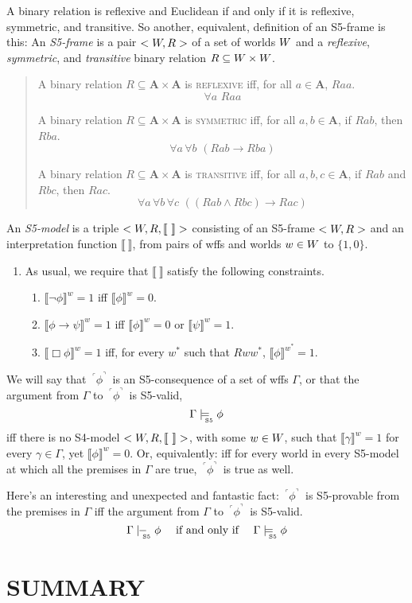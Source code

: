 \documentclass[landscape, two column, full page,reqno]{article}
\let\mathcal\relax
\newcommand{\mathcal}{\OMScal}%
\newcommand{\qd}{\begin{quote}\begin{description}  [align=left,style=nextline,leftmargin=*,labelsep=0pt,font=\normalfont]}
\newcommand{\zd}{\end{description}\end{quote}}
\newcommand{\qe}{\begin{enumerate}[align=left,style=nextline,leftmargin=17pt,labelsep=5pt,font=\normalfont]}
\newcommand{\ze}{\end{enumerate}}
\newcommand{\p}{\item}
\newcommand{\e}{\emph}
\newcommand{\mbf}{\mathbf}
\newcommand{\s}{\textsc}
\newcommand{\fns}[1]{{\footnotesize #1}}
\newcommand{\qq}[1]{ ~\!^\ulcorner #1  ^\urcorner~\!}
\newcommand{\V}[1]{\llbracket #1 \rrbracket}
\newcommand{\sfivemodels}{\models_{\!\!\!\raisebox{-3pt}{\text{\tiny S5}}}}
\newcommand{\sfiveproves}{\mid\hspace{-3.9pt}-_{\!\!\!\raisebox{-3pt}{\text{\tiny S5}}}\hspace{3pt}}
\newcommand{\B}{\Box}
\newcommand{\hs}{\hspace{2pt}}
\begin{document}
\p A binary relation is reflexive and Euclidean if and only if it is reflexive, symmetric, and transitive. So another, equivalent, definition of an S5-frame is this: An \e{S5-frame} is a pair $< \mathcal{W}, R >$ of a set of worlds $\mathcal{W}$ and a \e{reflexive}, \e{symmetric}, and \e{transitive} binary relation $R \subseteq \mathcal{W} \times \mathcal{W}$. 
	\qd
	\p[\s{reflexivity}] A binary relation $R \subseteq \mbf{A} \times \mbf{A}$ is \s{reflexive} iff, for all $a \in \mbf{A}$, $Raa$.
		\[
		\forall a \hs\hs Raa
		\]
	\p[\s{symmetry}] A binary relation $R \subseteq \mbf{A} \times \mbf{A}$ is \s{symmetric} iff, for all $a, b \in \mbf{A}$, if $Rab$, then $Rba$.
		\[
		\forall a \hs \forall b \hs\hs (Rab \to Rba)
		\]
	\p[\s{transitivity}] A binary relation $R \subseteq \mbf{A} \times \mbf{A}$ is \s{transitive} iff, for all $a, b, c \in \mbf{A}$, if $Rab$ and $Rbc$, then $Rac$.
		\[
		\forall a \hs \forall b \hs \forall c \hs\hs ((R ab \wedge Rbc) \to Rac)
		\]
	\zd
\p An \e{S5-model} is a triple $<\mathcal{W}, R, \V{~}>$ consisting of an S5-frame $<\mathcal{W}, R>$ and an interpretation function $\V{~}$, from pairs of wffs and worlds $w \in \mathcal{W}$ to $\{ 1, 0 \}$.  
	\qe
	\p As usual, we require that $\V{~}$ satisfy the following constraints.
		\qe
		\p[($\neg$)] $\V{\neg \phi}^w = 1$ iff $\V{\phi}^w = 0$.
		\p[($\to$)] $\V{\phi \to \psi}^w = 1$ iff $\V{\phi}^w = 0$ or $\V{\psi}^w = 1$.
		\p[($\B$)] $\V{\Box \phi}^w = 1$ iff, for every $w^*$ such that $R w w^*$, $\V{\phi}^{w^*}= 1$.
		\ze 		
	\ze

\p We will say that $\qq{\phi}$ is an S5-consequence of a set of wffs $\Gamma$, or that the argument from $\Gamma$ to $\qq{\phi}$ is S5-valid,
	\[
	\Gamma \sfivemodels \phi
	\]
iff there is no S4-model $< \mathcal{W}, R, \V{~} >$, with some $w \in \mathcal{W}$, such that $\V{\gamma}^w = 1$ for every $\gamma \in \Gamma$, yet $\V{\phi}^w = 0$.  Or, equivalently: iff for every  world  in every S5-model at which all the premises in $\Gamma$ are true, $\qq{\phi}$ is true as well.

\p Here's an interesting and unexpected and fantastic fact: $\qq{\phi}$ is S5-provable from the premises in  $\Gamma$ iff the argument from $\Gamma$ to $\qq{\phi}$ is S5-valid.
			\[
			\Gamma \sfiveproves \phi \quad \mbox{ if and only if } \quad \Gamma \sfivemodels \phi
			\]
			
			\section{S\fns{UMMARY}}
			
\end{document}
